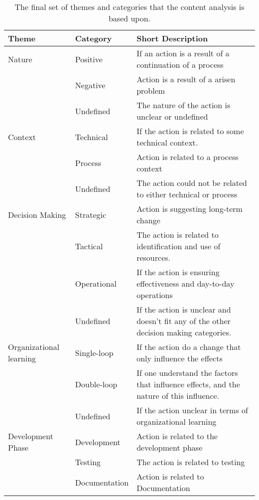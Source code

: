 \begin{table}[h]
	\begin{center}
		\caption{The final set of themes and categories that the content analysis is based upon.}
		\label{table:content-analysis-categories}
		\begin{adjustbox}{width=\textwidth, totalheight=0.9\textheight, keepaspectratio}
			\begin{tabular}{| l | l | p{} |}
			\hline
			Theme & Category & Short Description  \\
			\hline
			Nature & Positive & If an action is a result of a continuation of a process \\ \cline{2-3}
			& Negative & Action is a result of a arisen problem \\ \cline{2-3}
			& Undefined & The nature of the action is unclear or undefined \\ \hline
			Context & Technical & If the action is related to some technical context. \\ \cline{2-3}
			& Process & Action is related to a process context \\ \cline{2-3}
			& Undefined & The action could not be related to either technical or process \\ 
			\hline
			Decision Making & Strategic & Action is suggesting long-term change \\ \cline{2-3}
			& Tactical & The action is related to identification and use of resources. \\ \cline{2-3}
			& Operational & If the action is ensuring effectiveness and day-to-day operations \\ \cline{2-3}
			& Undefined & If the action is unclear and doesn't fit any of the other decision making categories. \\ 
			\hline 
			Organizational learning & Single-loop & If the action do a change that only influence the effects \\ \cline{2-3}
			& Double-loop & If one understand the factors that influence effects, and the nature of this influence. \\ \cline{2-3}
			& Undefined & If the action unclear in terms of organizational learning \\ \hline
			Development Phase & Development & Action is related to the development phase \\ \cline{2-3}
			& Testing & The action is related to testing \\ \cline{2-3}
			& Documentation & Action is related to Documentation \\ \cline{2-3}

\end{tabular}
\end{adjustbox}
\end{center}
\end{table}
